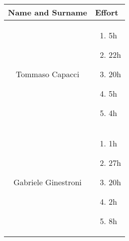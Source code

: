 \begin{center}
    \begin{tabular}{ |c|m{2.5cm}| }
        \hline
        \textbf{Name and Surname} & \textbf{Effort} \\
        \hline
        Tommaso Capacci &
        \begin{enumerate}
            \item 5h
            \item 22h
            \item 20h
            \item 5h
            \item 4h
        \end{enumerate} \\
        \hline
        Gabriele Ginestroni &
        \begin{enumerate}
            \item 1h
            \item 27h
            \item 20h
            \item 2h
            \item 8h
        \end{enumerate} \\
        \hline
    \end{tabular}
\end{center}